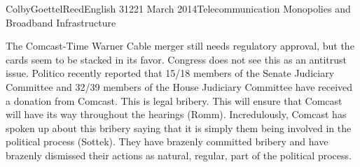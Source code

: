 \documentclass[12pt]{article}
\begin{document}
\begin{mla}{Colby}{Goettel}{Reed}{English 312}{21 March 2014}{Telecommunication Monopolies and Broadband Infrastructure}
\begin{figure}
\end{figure}

The Comcast-Time Warner Cable merger still needs regulatory approval, but the cards seem to be stacked in its favor. Congress does not see this as an antitrust issue. Politico recently reported that 15/18 members of the Senate Judiciary Committee and 32/39 members of the House Judiciary Committee have received a donation from Comcast. This is legal bribery. This will ensure that Comcast will have its way throughout the hearings (Romm). Incredulously, Comcast has spoken up about this bribery saying that it is simply them being involved in the political process (Sottek). They have brazenly committed bribery and have brazenly dismissed their actions as natural, regular, part of the political process.


\end{mla}
\end{document}
